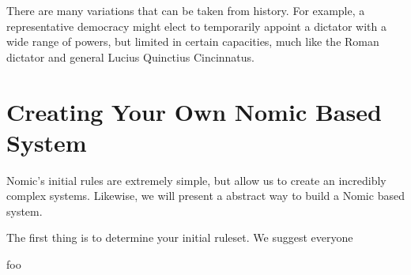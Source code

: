 \documentclass[11pt,letterpaper]{article}
\begin{document}
	There are many variations that can be taken from history.  
	For example, a representative democracy might elect to temporarily appoint a dictator with a wide range of powers, but limited in certain capacities, much like the Roman dictator and general Lucius Quinctius Cincinnatus.
	
	
	\section{Creating Your Own Nomic Based System}
	
	
	Nomic's initial rules are extremely simple, but allow us to create an incredibly complex systems.
	Likewise, we will present a abstract way to build a Nomic based system.
	
	The first thing is to determine your initial ruleset.
	We suggest everyone 
	
	
	
	
	
	foo \cite{camilleri2010playing}
	 \cite{tezos}
	
	
\end{document}
